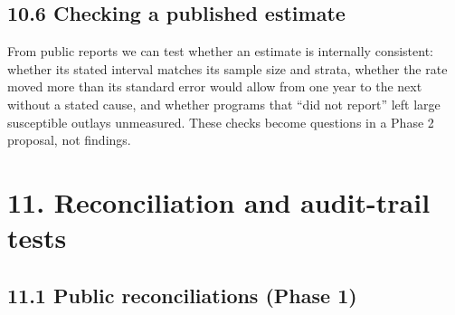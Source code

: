 \documentclass[letterpaper,11pt]{article}
\begin{document}
\hypertarget{checking-a-published-estimate}{%
\subsection*{10.6 Checking a published
estimate}\label{checking-a-published-estimate}}

From public reports we can test whether an estimate is internally
consistent: whether its stated interval matches its sample size and
strata, whether the rate moved more than its standard error would allow
from one year to the next without a stated cause, and whether programs
that ``did not report'' left large susceptible outlays unmeasured. These
checks become questions in a Phase 2 proposal, not findings.

\hypertarget{reconciliation-and-audit-trail-tests}{%
\section*{11. Reconciliation and audit-trail
tests}\label{reconciliation-and-audit-trail-tests}}

\hypertarget{public-reconciliations-phase-1}{%
\subsection*{11.1 Public reconciliations (Phase
1)}\label{public-reconciliations-phase-1}}
\end{document}
